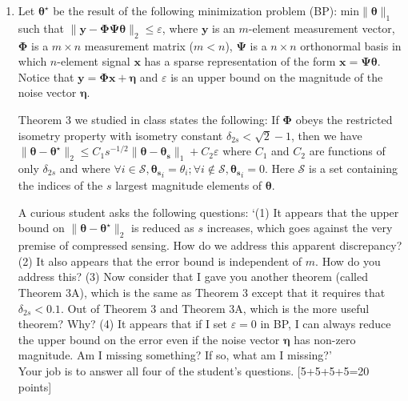 \documentclass[11pt]{article}
\begin{document}
\begin{enumerate}
\item Let $\boldsymbol{\theta^{\star}}$ be the result of the following minimization problem (BP): $\textrm{min} \|\boldsymbol{\theta}\|_1$ such that $\|\boldsymbol{y}-\boldsymbol{\Phi \Psi \theta}\|_2 \leq \varepsilon$, where $\boldsymbol{y}$ is an $m$-element measurement vector, $\boldsymbol{\Phi}$ is a $m \times n$ measurement matrix ($m < n$), $\boldsymbol{\Psi}$ is a $n \times n$ orthonormal basis in which $n$-element signal $\boldsymbol{x}$ has a sparse representation of the form $\boldsymbol{x} = \boldsymbol{\Psi \theta}$. Notice that $\boldsymbol{y} = \boldsymbol{\Phi x} + \boldsymbol{\eta}$ and $\varepsilon$ is an upper bound on the magnitude of the noise vector $\boldsymbol{\eta}$.

Theorem 3 we studied in class states the following: If $\boldsymbol{\Phi}$ obeys the restricted isometry property with isometry constant $\delta_{2s} < \sqrt{2}-1$, then we have $\|\boldsymbol{\theta} - \boldsymbol{\theta^{\star}}\|_2 \leq C_1 s^{-1/2}\|\boldsymbol{\theta}-\boldsymbol{\theta_s}\|_1 + C_2 \varepsilon$ where $C_1$ and $C_2$ are functions of only $\delta_{2s}$ and where $\forall i \in \mathcal{S}, \boldsymbol{\theta_s}_i = \theta_i; \forall i \notin \mathcal{S}, \boldsymbol{\theta_s}_i = 0$. Here $\mathcal{S}$ is a set containing the indices of the $s$ largest magnitude elements of $\boldsymbol{\theta}$. 

A curious student asks the following questions: `(1) It appears that the upper bound on $\|\boldsymbol{\theta} - \boldsymbol{\theta^{\star}}\|_2$ is reduced as $s$ increases, which goes against the very premise of compressed sensing. How do we address this apparent discrepancy? (2) It also appears that the error bound is independent of $m$. How do you address this? (3) Now consider that I gave you another theorem (called Theorem 3A), which is the same as Theorem 3 except that it requires that $\delta_{2s} < 0.1$. Out of Theorem 3 and Theorem 3A, which is the more useful theorem? Why? (4) It appears that if I set $\varepsilon = 0$ in BP, I can always reduce the upper bound on the error even if the noise vector $\boldsymbol{\eta}$ has non-zero magnitude. Am I missing something? If so, what am I missing?'
\\
Your job is to answer all four of the student's questions. \textsf{[5+5+5+5=20 points]}


\end{enumerate}
\end{document}
